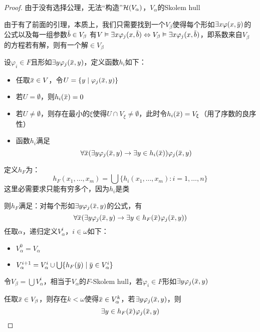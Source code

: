 \documentclass[11pt]{article}
\begin{document}
\begin{proof}
由于没有选择公理，无法“构造”\(\mathcal{H}(V_\alpha)\)，\(V_\alpha\)的Skolem hull

由于有了前面的引理，本质上，我们只需要找到一个\(V_\beta\)使得每个形如\(\exists x\varphi(x,\bary)\)的公式以及每一组参数\(\barb\in V_\beta\)
有\(V\vDash\exists x\varphi_j(x,\barb)\Leftrightarrow V_\beta\vDash\exists x\varphi_j(x,\barb)\)，即系数来自\(V_\beta\)的方程若有解，则有一个解\(\in V_\beta\)

设\(\varphi_i\in F\)且形如\(\exists y\varphi_j(\barx,y)\)，定义函数\(h_i\)如下：
\begin{itemize}
\item 任取\(\barx\in V\)，令\(U=\{y\mid\varphi_j(\barx,y)\}\)
\item 若\(U=\emptyset\)，则\(h_i(\barx)=0\)
\item 若\(U\neq\emptyset\)，则存在最小的\(\xi\)使得\(U\cap V_\xi\neq\emptyset\)，此时令\(h_i(\barx)=V_\xi\)（用了序数的良序性）
\item 函数\(h_i\)满足
\begin{equation*}
\forall\barx(\exists y\varphi_j(\barx,y)\to\exists y\in h_i(\barx))\varphi_j(\barx,y)
\end{equation*}
\end{itemize}

定义\(h_F\)为：
\begin{equation*}
h_F(x_1,\dots,x_m)=\bigcup\{h_i(x_1,\dots,x_m):i=1,\dots,n\}
\end{equation*}
这里必需要求只能有穷多个，因为\(h_i\)是类

则\(h_F\)满足：对每个形如\(\exists y\varphi_j(\barx,y)\)的公式，有
\begin{equation*}
\forall\barx(\exists y\varphi_j(\barx,y)\to\exists y\in h_F(\barx)\varphi_j(\barx,y))
\end{equation*}
任取\(\alpha\)，递归定义\(V_\alpha^i\)，\(i\in\omega\)如下：
\begin{itemize}
\item \(V_\alpha^0=V_\alpha\)
\item \(V_\alpha^{i+1}=V_\alpha^i\cup\bigcup\{h_F(\bary)\mid\bary\in V_\alpha^i\}\)
\end{itemize}


令\(V_\beta=\bigcup V_\alpha^i\)，相当于\(V_\alpha\)的\(F\)-Skolem hull，若\(\varphi_i\in F\)形如\(\exists y\varphi_j(\barx,y)\)

任取\(\barx\in V_\beta\)，则存在\(k<\omega\)使得\(\barx\in V_\alpha^k\)，若\(\exists y\varphi_j(\barx,y)\)，则
\begin{equation*}
\exists y\in h_F(\barx)\varphi_j(\barx,y)
\end{equation*}
\end{proof}
\end{document}

